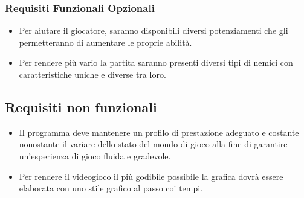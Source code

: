 \documentclass[a4paper,12pt]{report}
\begin{document}
\subsubsection{Requisiti Funzionali Opzionali}
\begin{itemize}
	\item Per aiutare il giocatore, saranno disponibili diversi potenziamenti che gli permetteranno di aumentare le proprie abilità.
	\item Per rendere più vario la partita saranno presenti diversi tipi di nemici con caratteristiche uniche e diverse tra loro.
\end{itemize}
\subsection*{Requisiti non funzionali}
\begin{itemize}
	\item Il programma deve mantenere un profilo di prestazione adeguato e costante nonostante il variare dello stato del mondo di gioco alla fine di garantire un’esperienza di gioco fluida e gradevole.
	\item Per rendere il videogioco il più godibile possibile la grafica dovrà essere elaborata con uno stile grafico al passo coi tempi.
\end{itemize}
\newpage
\end{document}
